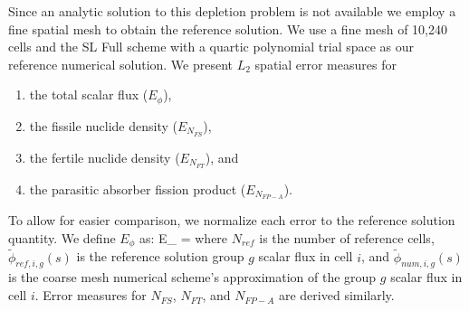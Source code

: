 Since an analytic solution to this depletion problem is not available we employ a fine spatial mesh to obtain the reference solution.  
We use a fine mesh of 10,240 cells and the SL Full scheme with a quartic polynomial trial space as our reference numerical solution. 
We present $L_2$ spatial error measures for 
\begin{enumerate}
\item the total scalar flux ($E_{\phi}$), 
\item the fissile nuclide density ($E_{N_{FS}}$),
\item the fertile nuclide density ($E_{N_{FT}}$), and 
\item the parasitic absorber fission product ($E_{N_{FP-A}}$).
\end{enumerate}
To allow for easier comparison, we normalize each error to the reference solution quantity.
We define $E_{\phi}$ as:
\benum
E_{\phi} =  \pec
\eenum
%
%
where $N_{ref}$ is the number of reference cells, $\widetilde{\phi}_{ref,i,g}(s)$ is the reference solution group $g$ scalar flux in cell $i$, and $\widetilde{\phi}_{num,i,g}(s)$ is the coarse mesh numerical scheme's approximation of the group $g$ scalar flux in cell $i$.
Error measures for $N_{FS}$, $N_{FT}$, and $N_{FP-A}$ are derived similarly.

